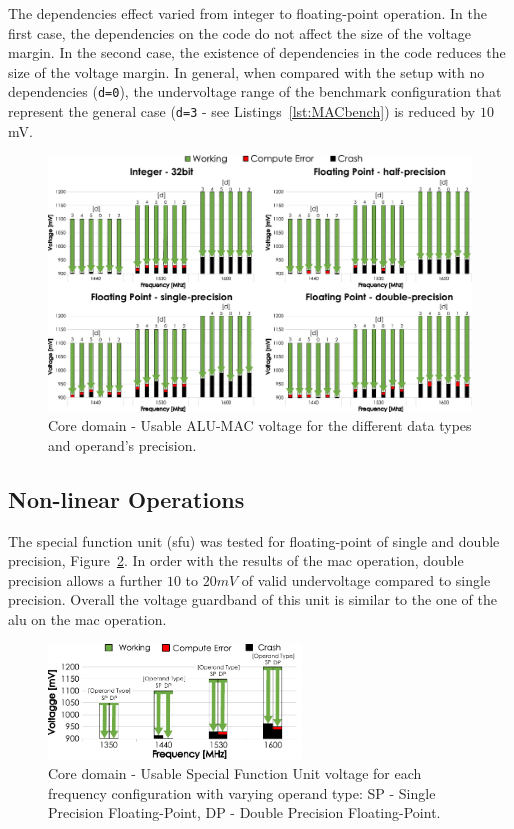 The dependencies effect varied from integer to floating-point operation. In the first case, the dependencies on the code do not affect the size of the voltage margin. In the second case, the existence of dependencies in the code reduces the size of the voltage margin. In general, when compared with the setup with no dependencies (\texttt{d=0}), the undervoltage range of the benchmark configuration that represent the general case (\texttt{d=3} - see Listings~\ref{lst:MACbench}) is reduced by $10$mV. 

\begin{figure}[htb]
  \centering
  \includegraphics[width=1\textwidth]{Figures/GPU_characterization/MAC_Guardband.pdf}
  \caption{Core domain - Usable ALU-MAC voltage for the different data types and operand's precision.}
  \label{fig:MAC_guardband}
\end{figure}

\subsection{Non-linear Operations}

The special function unit (\acrshort{sfu}) was tested for floating-point of single and double precision, Figure~\ref{fig:SFU_guardband}. In order with the results of the \acrshort{mac} operation, double precision allows a further $10$ to $20mV$ of valid undervoltage compared to single precision. Overall the voltage guardband of this unit is similar to the one of the \acrshort{alu} on the \acrshort{mac} operation. 

\begin{figure}[htb]
  \centering
  \includegraphics[width=0.6\textwidth]{Figures/GPU_characterization/SFU_guardband.pdf}
  \caption{Core domain - Usable Special Function Unit voltage for each frequency configuration with varying operand type: SP - Single Precision Floating-Point, DP - Double Precision Floating-Point.}
  \label{fig:SFU_guardband}
\end{figure}

